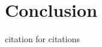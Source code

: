 \documentclass[a4paper]{report}
\begin{document}
\chapter{Conclusion}




\newpage
citation for citations\cite{Bengtsson1995}




\newpage



% 
\end{document}
